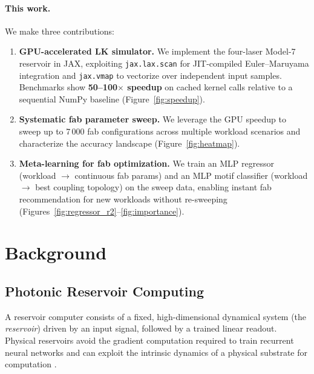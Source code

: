 \documentclass{article}
\begin{document}
\paragraph{This work.}
We make three contributions:
\begin{enumerate}
  \item \textbf{GPU-accelerated LK simulator.}
        We implement the four-laser Model-7 reservoir in JAX, exploiting
        \texttt{jax.lax.scan} for JIT-compiled Euler--Maruyama integration and
        \texttt{jax.vmap} to vectorize over independent input samples.
        Benchmarks show \textbf{50--100$\times$ speedup} on cached kernel
        calls relative to a sequential NumPy baseline
        (Figure~\ref{fig:speedup}).

  \item \textbf{Systematic fab parameter sweep.}
        We leverage the GPU speedup to sweep up to 7\,000 fab configurations
        across multiple workload scenarios and characterize the accuracy
        landscape (Figure~\ref{fig:heatmap}).

  \item \textbf{Meta-learning for fab optimization.}
        We train an MLP regressor (workload $\to$ continuous fab params) and
        an MLP motif classifier (workload $\to$ best coupling topology) on
        the sweep data, enabling instant fab recommendation for new workloads
        without re-sweeping (Figures~\ref{fig:regressor_r2}--\ref{fig:importance}).
\end{enumerate}

\section{Background}
\label{sec:background}

\subsection{Photonic Reservoir Computing}
\label{sec:photonic_rc}

A reservoir computer consists of a fixed, high-dimensional dynamical system
(the \emph{reservoir}) driven by an input signal, followed by a trained linear
readout.
Physical reservoirs avoid the gradient computation required to train recurrent
neural networks and can exploit the intrinsic dynamics of a physical substrate
for computation \citep{nakajima2020physical,tanaka2019recent}.
\end{document}
